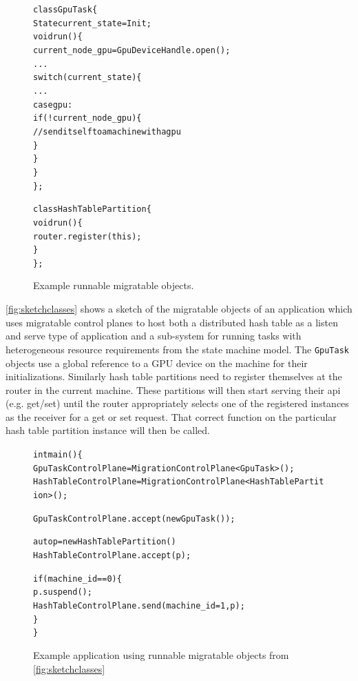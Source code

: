 \begin{figure}[tp]
\begin{alltt}

class GpuTask \{
    State current_state = Init;
    void run() \{
        current_node_gpu = GpuDeviceHandle.open();
        ...
        switch(current_state) \{
            ...
            case gpu:
              if(!current_node_gpu) \{
                // send itself to a machine with a gpu
              \}
        \}
    \}
\};

class HashTablePartition \{
    void run() \{
        router.register(this);
    \}
\};
\end{alltt}
\caption{
    Example runnable migratable objects.
}
\label{fig:sketchclasses}
\end{figure}

\autoref{fig:sketchclasses} shows a sketch of the migratable objects of
an application which uses migratable control planes to
host both a distributed hash table as a listen and serve type of
application and a sub-system for running tasks with heterogeneous resource
requirements from the state machine model. The \texttt{GpuTask} objects
use a global reference to a GPU device on the machine for their
initializations. Similarly hash table partitions need to register
themselves at the router in the current machine. These partitions will
then start serving their api (e.g. get/set) until the router appropriately
selects one of the registered instances as the receiver for a get or set
request. That correct function on the particular hash table partition
instance will then be called.



\begin{figure}[tp]
\begin{alltt}
int main() \{
    GpuTaskControlPlane = MigrationControlPlane<GpuTask>();
    HashTableControlPlane = MigrationControlPlane<HashTablePartition>();

    GpuTaskControlPlane.accept(new GpuTask());

    auto p = new HashTablePartition()
    HashTableControlPlane.accept(p);

    if(machine_id == 0) \{
        p.suspend();
        HashTableControlPlane.send(machine_id=1, p);
    \}
\}


\end{alltt}
\caption{
    Example application using runnable migratable objects from \autoref{fig:sketchclasses}
}
\label{fig:sketchmain}
\end{figure}



